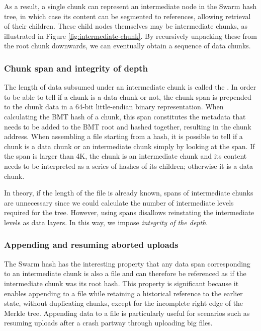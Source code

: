 As a result, a single chunk can represent an intermediate node in the Swarm hash tree, in which case its content can be segmented to references, allowing retrieval of their children. These child nodes themselves may be intermediate chunks, as illustrated in Figure \ref{fig:intermediate-chunk}. By recursively unpacking these from the root chunk downwards, we can eventually obtain a sequence of data chunks. 

 \subsubsection{Chunk span and integrity of depth}

The length of data subsumed under an intermediate chunk is called the . In order to be able to tell if a chunk is a data chunk or not, the chunk span is prepended to the chunk data in a 64-bit little-endian binary representation. When calculating the BMT hash of a chunk, this span constitutes the metadata that needs to be added to the BMT root and hashed together, resulting in the chunk address. When assembling a file starting from a hash, it is possible to tell if a chunk is a data chunk or an intermediate chunk simply by looking at the span. If the span is larger than 4K, the chunk is an intermediate chunk and its content needs to be interpreted as a series of hashes of its children; otherwise it is a data chunk.

In theory, if the length of the file is already known, spans of intermediate chunks are unnecessary since we could calculate the number of intermediate levels required for the tree. However, using spans disallows reinstating the intermediate levels as data layers. In this way, we impose \emph{integrity of the depth}. 

\subsubsection{Appending and resuming aborted uploads}

The Swarm hash has the interesting property that any data span corresponding to an intermediate chunk is also a file and can therefore be referenced as if the intermediate chunk was its root hash. This property is significant because it enables appending to a file while retaining a historical reference to the earlier state, without duplicating chunks, except for the incomplete right edge of the Merkle tree. Appending data to a file is particularly useful for scenarios such as resuming uploads after a crash partway through uploading big files.

